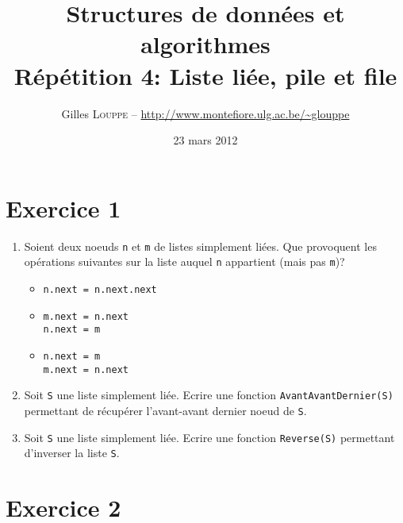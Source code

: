 \documentclass[a4paper,10pt]{article}
\title{
    \textbf{Structures de données et algorithmes}\\
    Répétition 4: Liste liée, pile et file
}
\author{Gilles \textsc{Louppe} -- \url{http://www.montefiore.ulg.ac.be/~glouppe}}
\date{23 mars 2012}
\begin{document}
\maketitle

\section*{Exercice 1}

\begin{enumerate}

\item Soient deux noeuds \texttt{n} et \texttt{m} de listes simplement liées. Que provoquent les opérations suivantes sur la liste auquel \texttt{n} appartient (mais pas \texttt{m})?

\begin{itemize}

\item
\begin{verbatim}
n.next = n.next.next
\end{verbatim}

\item
\begin{verbatim}
m.next = n.next
n.next = m
\end{verbatim}

\item
\begin{verbatim}
n.next = m
m.next = n.next
\end{verbatim}

\end{itemize}

\item Soit \texttt{S} une liste simplement liée. Ecrire une fonction \texttt{AvantAvantDernier(S)} permettant de récupérer l'avant-avant dernier noeud de \texttt{S}.

\item Soit \texttt{S} une liste simplement liée. Ecrire une fonction \texttt{Reverse(S)} permettant d'inverser la liste \texttt{S}.

\end{enumerate}

\section*{Exercice 2}
\end{document}
